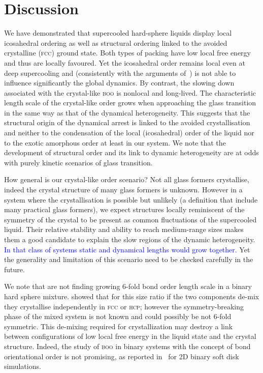 \section*{Discussion}
We have demonstrated that supercooled hard-sphere liquids display local icosahedral ordering as well as structural ordering linked to the avoided crystalline (\textsc{fcc}) ground state. Both types of packing have low local free energy and thus are locally favoured. Yet the icosahedral order remains local even at deep supercooling and (consistently with the arguments of~\citep{Berthier2007}) is not able to influence significantly the global dynamics. By contrast, the slowing down associated with the crystal-like \textsc{boo} is nonlocal and long-lived. The characteristic length scale of the crystal-like order grows when approaching the glass transition in the same way as that of the dynamical heterogeneity. This suggests that the structural origin of the dynamical arrest is linked to the avoided crystallisation and neither to the condensation of the local (icosahedral) order of the liquid nor to the exotic amorphous order at least in our system. We note that the development of structural order and its link to dynamic heterogeneity are at odds with purely kinetic scenarios of glass transition.

How general is our crystal-like order scenario? Not all glass formers crystallise, indeed the crystal structure of many glass formers is unknown. However in a system where the crystallisation is possible but unlikely (a definition that include many practical glass formers), we expect structures locally reminiscent of the symmetry of the crystal to be present as common fluctuations of the supercooled liquid. Their relative stability and ability to reach medium-range sizes makes them a good candidate to explain the slow regions of the dynamic heterogeneity. \textcolor{blue}{In that class of systems static and dynamical lengths would grow together.} Yet the generality and limitation of this scenario need to be checked carefully in the future.

We note that \citet{Charbonneau} are not finding growing 6-fold bond order length scale in a binary hard sphere mixture. \citet{Hopkins2011b,Hopkins2012} showed that for this size ratio if the two components de-mix they crystallise independently in \textsc{fcc} or \textsc{hcp}; however the symmetry-breaking phase of the mixed system is not known and could possibly be not 6-fold symmetric. This de-mixing required for crystallization may destroy a link between configurations of low local free energy in the liquid state and the crystal structure. Indeed, the study of \textsc{boo} in binary systems with the concept of bond orientational order is not promising, as reported in~\citep{tanaka2010critical, KawasakiJPCM} for 2D binary soft disk simulations.

